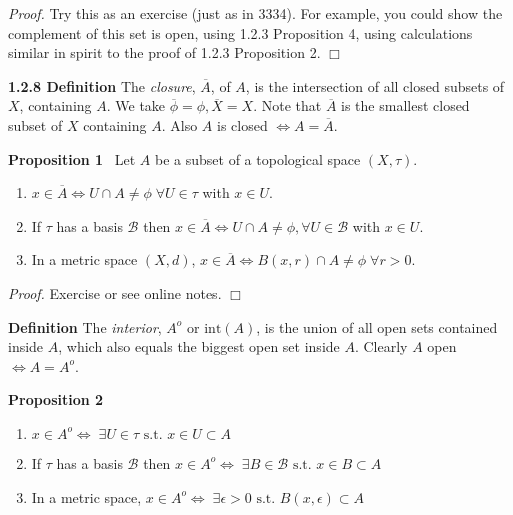 \documentclass[12pt]{article}
\newcommand{\st}[0]{ \textrm{ s.t. } }
\newcommand{\lrimply}[0] { \Leftrightarrow }
\newcommand{\eps}[0] {  \epsilon }
\newcommand{\B}[0] { \mathcal{B} }
\begin{document}
\emph{Proof.  }  Try this as an exercise (just as in 3334).  For example,
you could show the complement of this set is open, using 1.2.3 Proposition 4,
using calculations similar in spirit to the proof of 1.2.3 Proposition 2.
$\Box$

\begin{flushleft}
 { \bf 1.2.8 Definition }The \emph{closure}, $\overline{A}$, of $A$, is the intersection of all closed subsets of $X$, containing $A$.
   We take  $\overline{\phi} = \phi, \overline{X} = X$.
     Note that
 $\overline{A}$ is the smallest closed subset of $X$ containing $A$.
Also $A$ is closed $\lrimply A = \overline{A}$.\end{flushleft}\begin{flushleft}
 { \bf Proposition 1 } \ Let $A$ be a subset of a topological space $(X,\tau)$.
\begin{enumerate}
\item
                $x \in \overline{A} \lrimply U \cap A \neq \phi \;
\forall  U \in \tau$ with $x \in U$.
            \item
                If $\tau$ has a basis $\B$ then $x \in \overline{A}
\lrimply U \cap A \not = \phi, \forall U \in \B$ with $x \in U$.
            \item
                In a metric space $(X, d)$, $x \in \overline{A} \lrimply B(x, r) \cap A \not = \phi \; \forall r>0$.
            \end{enumerate}\begin{flushleft}
 \emph{Proof.  }  Exercise or see online notes.   $\Box$
\end{flushleft}\end{flushleft}\begin{flushleft}
 { \bf Definition }The \emph{interior}, $A^o$ or $\textrm{int}(A)$,
 is the union of all
open sets contained inside $A$, which also equals the biggest open set inside $A$. Clearly $A$ open $\lrimply A = A^o$.\end{flushleft}\begin{flushleft}
 { \bf Proposition 2 } \ \begin{enumerate}
\item
                $x \in A^o \lrimply \; \exists U \in \tau \st x \in U \subset A$
            \item
                If $\tau$ has a basis $\B$ then $x \in A^o \lrimply  \; \exists
B \in \B \st x \in B \subset A$
            \item
                In a metric space, $x \in A^o \lrimply \; \exists \eps > 0 \st B(x, \eps) \subset A$

\end{enumerate}
\end{flushleft}
\end{document}
